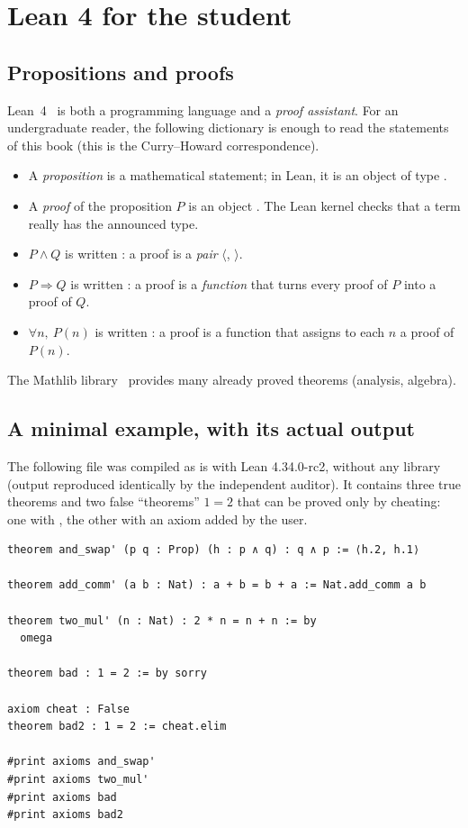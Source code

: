 \section{Lean 4 for the student}
\label{ch1:sec:lean}

\subsection{Propositions and proofs}

Lean~4~\cite{lean4} is both a programming language and a \emph{proof assistant}. For an undergraduate reader,
the following dictionary is enough to read the statements of this book (this is the Curry--Howard correspondence).
\begin{itemize}
\item A \emph{proposition} is a mathematical statement; in Lean, it is an object of type .
\item A \emph{proof} of the proposition $P$ is an object . The Lean kernel checks that a term really has the announced type.
\item $P\wedge Q$ is written : a proof is a \emph{pair} $\langle$, $\rangle$.
\item $P\Rightarrow Q$ is written : a proof is a \emph{function} that turns every proof of $P$ into a proof of $Q$.
\item $\forall n,\ P(n)$ is written : a proof is a function that assigns to each $n$ a proof of $P(n)$.
\end{itemize}
The Mathlib library~\cite{mathlib} provides many already proved theorems (analysis, algebra).

\subsection{A minimal example, with its actual output}

The following file was compiled as is with Lean 4.34.0-rc2, without any library (output reproduced identically by the independent auditor). It contains three true theorems and two false
``theorems'' $1=2$ that can be proved only by cheating: one with , the other with an axiom added by the user.

\begin{leanbox}
\begin{lstlisting}[language=Lean]
theorem and_swap' (p q : Prop) (h : p ∧ q) : q ∧ p := ⟨h.2, h.1⟩

theorem add_comm' (a b : Nat) : a + b = b + a := Nat.add_comm a b

theorem two_mul' (n : Nat) : 2 * n = n + n := by
  omega

theorem bad : 1 = 2 := by sorry

axiom cheat : False
theorem bad2 : 1 = 2 := cheat.elim

#print axioms and_swap'
#print axioms two_mul'
#print axioms bad
#print axioms bad2
\end{lstlisting}
\end{leanbox}

